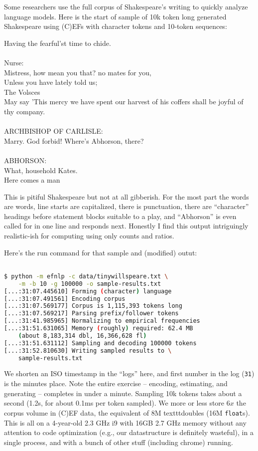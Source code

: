 \documentclass[11pt, oneside]{amsart}   	%
\begin{document}
Some researchers use the full corpus of Shakespeare's writing to quickly analyze language models. Here is the start of sample of 10k token long generated Shakespeare using (C)EFs with character tokens and 10-token sequences: 
\begin{displayquote}
Having the fearful'st time to chide.\\
\\
Nurse:\\
Mistress, how mean you that? no mates for you,\\
Unless you have lately told us;\\
The Volsces\\
May say 'This mercy we have spent our harvest of his coffers shall be joyful of thy company.\\
\\
ARCHBISHOP OF CARLISLE:\\
Marry. God forbid! Where's Abhorson, there?\\
\\
ABHORSON:\\
What, household Kates.\\
Here comes a man\\
\end{displayquote}
This is pitiful Shakespeare but not at all gibberish. For the most part the words are words, line starts are capitalized, there is punctuation, there are ``character'' headings before statement blocks suitable to a play, and ``Abhorson'' is even called for in one line and responds next. Honestly I find this output intriguingly realistic-ish for computing using only counts and ratios. 

Here's the run command for that sample and (modified) outut: 
\begin{lstlisting}[language=bash,caption={Analyzing and generating some Shakespeare with (C)EFs}]

$ python -m efnlp -c data/tinywillspeare.txt \
	-m -b 10 -g 100000 -o sample-results.txt
[...:31:07.445610] Forming (character) language
[...:31:07.491561] Encoding corpus
[...:31:07.569177] Corpus is 1,115,393 tokens long
[...:31:07.569217] Parsing prefix/follower tokens
[...:31:41.985965] Normalizing to empirical frequencies
[...:31:51.631065] Memory (roughly) required: 62.4 MB 
	(about 8,183,314 dbl, 16,366,628 fl)
[...:31:51.631112] Sampling and decoding 100000 tokens
[...:31:52.810630] Writing sampled results to \
	sample-results.txt
\end{lstlisting}
We shorten an ISO timestamp in the ``logs'' here, and first number in the log (\texttt{31}) is the minutes place. Note the entire exercise -- encoding, estimating, and generating -- completes in under a minute. Sampling 10k tokens takes about a second (1.2s, for about 0.1ms per token sampled). We more or less store $6x$ the corpus volume in (C)EF data, the equivalent of 8M texttt{double}s (16M \texttt{float}s). This is all on a 4-year-old 2.3 GHz i9 with 16GB 2.7 GHz memory without any attention to code optimization (e.g., our datastructure is definitely wasteful), in a single process, and with a bunch of other stuff (including chrome) running. 
\end{document}
